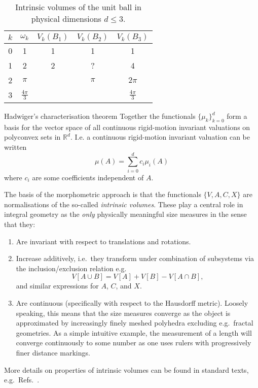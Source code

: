 \begin{SCtable}
  \begin{minipage}[b]{\linewidth}
    \centering
    \begin{tabular}{ccccc}
      \toprule
      $k$ & $\omega_k$ & $V_k(B_1)$ & $V_k(B_2)$ & $V_k(B_3)$ \\
      \midrule
      0 & 1 & 1 & 1 & 1 \\
      1 & 2 & 2 & ? & 4 \\
      2 & $\pi$ && $\pi$ & $2\pi$ \\
      3 & $\frac{4\pi}{3}$ &&& $\frac{4\pi}{3}$ \\
      \bottomrule
    \end{tabular}
  \end{minipage}
  \caption{Intrinsic volumes of the unit ball in physical dimensions $d \le 3$.}
\end{SCtable}

\begin{theorem}{Hadwiger's characterisation theorem}
  Together the functionals $\{\mu_k\}_{k=0}^d$ form a basis for the vector space of all continuous rigid-motion invariant valuations on polyconvex sets in $\mathbb{R}^d$.
I.e. a continuous rigid-motion invariant valuation can be written
\begin{equation}
  \mu(A) = \sum_{i=0}^d c_i \mu_i(A)
\end{equation}
where $c_i$ are some coefficients independent of $A$.
\end{theorem}

The basis of the morphometric approach is that the functionals $\{V,A,C,X\}$ are normalisations of the so-called \emph{intrinsic volumes}.
These play a central role in integral geometry as the \emph{only} physically meaningful size measures in the sense that they:
\begin{enumerate}
\item Are invariant with respect to translations and rotations.
\item Increase additively, i.e.\ they transform under combination of subsystems via the inclusion/exclusion relation e.g.\
  \begin{equation*}\label{eq:additivity}
    V[A \cup B] = V[A] + V[B] - V[A \cap B],
  \end{equation*}
  and similar expressions for $A$, $C$, and $X$.
\item Are continuous (specifically with respect to the Hausdorff metric).
  Loosely speaking, this means that the size measures converge as the object is approximated by increasingly finely meshed polyhedra excluding e.g.\ fractal geometries.
  As a simple intuitive example, the measurement of a length will converge continuously to some number as one uses rulers with progressively finer distance markings.
\end{enumerate}
More details on properties of intrinsic volumes can be found in standard texts, e.g.\ Refs.\ \cite{Santalo2004,Klain1997}.

